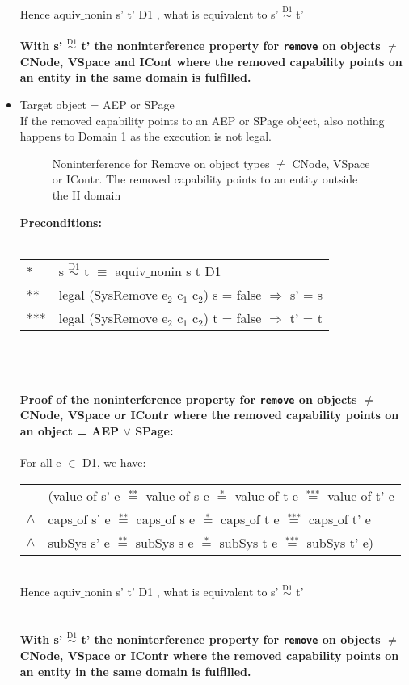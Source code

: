 \begin{itemize}
\begin{tabular}{ll}
\end{tabular} \\
Hence aquiv$\_$nonin s' t' D1 , what is equivalent to s' $\overset{\text{D1}}{\sim}$ t' \\ \\ 
\textbf{With s' $\overset{\text{D1}}{\sim}$ t' the noninterference property for \texttt{remove} on objects $\neq$ CNode, VSpace and ICont where the removed capability points on an entity in the same domain is fulfilled.}  
\clearpage
\item Target object = AEP or SPage \\
If the removed capability points to an AEP or SPage object, also nothing happens to Domain 1 as the execution is not legal. 
\begin{figure}[H]
\caption{Noninterference for Remove on object types $\neq$ CNode, VSpace or IContr. The removed capability points to an entity outside the H domain}
\label{fig:RemoveOutside2}
\end{figure}
\textbf{Preconditions:} \\ \\
\begin{tabular}{ll}
* & s $\overset{\text{D1}}{\sim}$ t $\equiv$ aquiv$\_$nonin s t D1	\\ 
** & legal (SysRemove e$_2$ c$_1$ c$_2$) s = false $\Rightarrow$ s' = s \\ 
*** & legal (SysRemove e$_2$ c$_1$ c$_2$) t = false $\Rightarrow$ t' = t
\end{tabular} \\ \\ \\
\textbf{Proof of the noninterference property for \texttt{remove} on objects $\neq$ CNode, VSpace or IContr where the removed capability points on an object = AEP $\vee$ SPage:}\\ \\
For all e $\in$ D1, we have: \\ 
\begin{tabular}{ll}
& (value$\_$of s' e $\overset{\text{**}}{=}$ value$\_$of s e $\overset{\text{*}}{=}$ value$\_$of t e $\overset{\text{***}}{=}$ value$\_$of t' e \\
$\wedge$ & caps$\_$of s' e $\overset{\text{**}}{=}$ caps$\_$of s e $\overset{\text{*}}{=}$ caps$\_$of t e $\overset{\text{***}}{=}$ caps$\_$of t' e \\
$\wedge$ & subSys s' e $\overset{\text{**}}{=}$ subSys s e $\overset{\text{*}}{=}$ subSys t e $\overset{\text{***}}{=}$ subSys t' e)
\end{tabular} \\
Hence aquiv$\_$nonin s' t' D1 , what is equivalent to s' $\overset{\text{D1}}{\sim}$ t'\\ \\ \\
\textbf{With s' $\overset{\text{D1}}{\sim}$ t' the noninterference property for \texttt{remove} on objects $\neq$ CNode, VSpace or IContr where the removed capability points on an entity in the same domain is fulfilled.}  
\end{itemize}